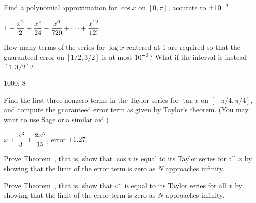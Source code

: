 \begin{exercises}
  \begin{exercise} Find a polynomial approximation for $\cos x$ on
    $[0,\pi]$, accurate to $\displaystyle \pm 10^{-3}$
\begin{answer} $\displaystyle 1-{x^2\over2}+{x^4\over24}-{x^6\over 720}
+\cdots+{x^{12}\over 12!}$
\end{answer}\end{exercise}

\begin{exercise} How many terms of the series for $\log x$ centered at
  1 are required so that the guaranteed error on $[1/2,3/2]$ is at
  most $\displaystyle 10^{-3}$? What if the interval is instead $[1,3/2]$?
\begin{answer} $1000$; $8$ 
\end{answer}\end{exercise}

\begin{exercise} Find the first three nonzero terms in the Taylor
  series for $\tan x$ on $[-\pi/4,\pi/4]$, and compute the guaranteed
  error term as given by Taylor's theorem. (You may want to use Sage
  or a similar aid.)
\begin{answer} $\displaystyle x+{x^3\over3}+{2x^5\over15}$, error $\pm 1.27$.
\end{answer}\end{exercise}

\begin{exercise} Prove Theorem~, that
  is, show that $\cos x$ is equal to its Taylor series for all $x$ by
  showing that the limit of the error term is zero as $N$ approaches
  infinity.
\end{exercise}

\begin{exercise} Prove Theorem~, that is,
  show that $\displaystyle e^x$ is equal to its Taylor series for all $x$ by
  showing that the limit of the error term is zero as $N$ approaches
  infinity.
\end{exercise}

\end{exercises}

